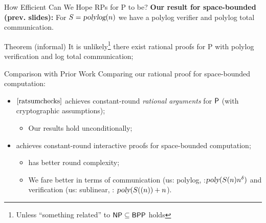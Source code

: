 \begin{frame}{How Efficient Can We Hope RPs for P to be?}
	\textbf{Our result for space-bounded (prev. slides):} For $S = \polylog(n)$ we have a polylog verifier and polylog total communication.
	\pause
	\bigskip
	\begin{block}{Theorem (informal)}
It is unlikely\footnote{Unless ``something related'' to $\NP \subseteq \BPP$ holds} there exist rational proofs for P with polylog verification and log total communication;
\end{block}
\end{frame}

\begin{frame}{Comparison with Prior Work}
\large{Comparing our rational proof for space-bounded computation:}\pause
	\begin{itemize}[<+- | alert@+>]
		\item $\cite{ratsumchecks}$ achieves constant-round \textit{rational arguments} for $\P$ (with cryptographic assumptions);
		\begin{itemize}
			\item Our results hold unconditionally;
		\end{itemize}
		\item \cite{rrr16} achieves constant-round interactive proofs for space-bounded computation;
		\begin{itemize}
			\item \cite{rrr16} has better round complexity;
			\item We fare better in terms of communication (us: polylog, \cite{rrr16}:$\poly(S(n)n^{\delta})$ and verification (us: sublinear, \cite{rrr16}: $\poly(S((n)) + n$).
		\end{itemize}
	\end{itemize}
\end{frame}


